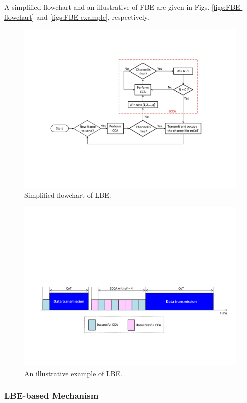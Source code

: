 \documentclass[journal,draftclsnofoot,12pt,onecolumn]{IEEEtran}
\begin{document}
A simplified flowchart and an illustrative of FBE are given in Figs. \ref{figs:FBE-flowchart} and \ref{figs:FBE-example}, respectively.



\begin{figure}[!t]
\centering
\includegraphics[width=0.9\columnwidth]{figures2/LBE-flowchart}
\caption{Simplified flowchart of LBE.}
\label{figs:LBE-flowchart}
\end{figure}

\begin{figure}[!t]
\centering
\includegraphics[width=0.9\columnwidth]{figures2/LBE-example}
\caption{An illustrative example of LBE.}
\label{figs:LBE-example}
\end{figure}

\subsubsection{LBE-based Mechanism}
\end{document}
